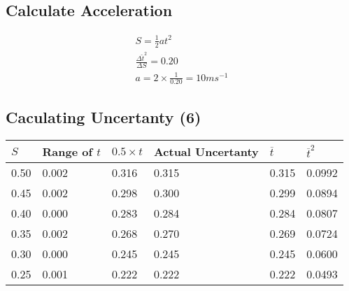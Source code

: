 \documentclass{article}
\begin{document}
\begin{center}

\end{center}

\subsection{Calculate Acceleration}

\begin{gather}
	S = \frac{1}{2} at^2 \\
	\frac{\Delta \hat{t}^2}{\Delta{S}} = 0.20 \\
	a = 2 \times \frac{1}{0.20} = 10 \si{ms^{-1}}
\end{gather}

\subsection{Caculating Uncertanty (6)}
\begin{center}
    \begin{tabular}{l|l|l|l|l|l}
     $S$ & Range of $t$ & $0.5 \times t$ & Actual Uncertanty & $\overline{t}$ & ${\overline{t}}^2$\\ \hline
     0.50 & 0.002 & 0.316 & 0.315 & 0.315 & 0.0992 \\
     0.45 & 0.002 & 0.298 & 0.300 & 0.299 & 0.0894 \\
     0.40 & 0.000 & 0.283 & 0.284 & 0.284 & 0.0807 \\
     0.35 & 0.002 & 0.268 & 0.270 & 0.269 & 0.0724 \\
     0.30 & 0.000 & 0.245 & 0.245 & 0.245 & 0.0600 \\
     0.25 & 0.001 & 0.222 & 0.222 & 0.222 & 0.0493 \\
    \end{tabular}
\end{center}
\end{document}
